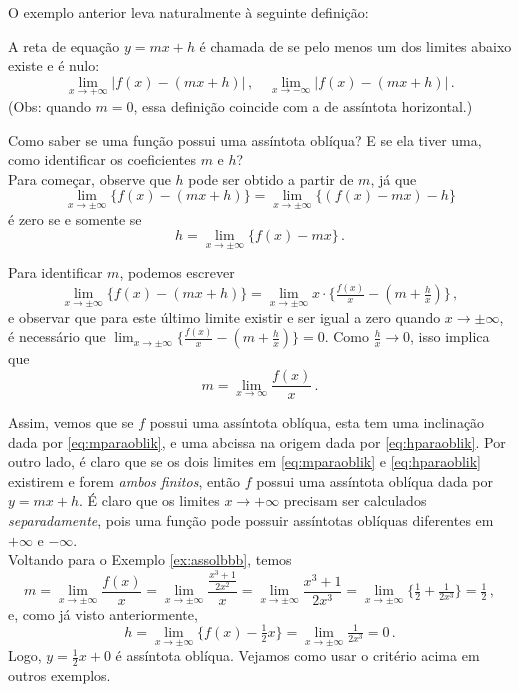 O exemplo anterior leva naturalmente à seguinte definição:

\begin{defin}
A reta de equação $y=mx+h$ é chamada de  
se pelo menos um
dos limites abaixo existe e é nulo:
$$\lim_{x\to +\infty}\bigl|f(x)-(mx+h)\bigr|\,,\quad\lim_{x\to
-\infty}\bigl|f(x)-(mx+h)\bigr|\,.$$
(Obs: quando $m=0$, essa definição coincide com a de assíntota
horizontal.)
\end{defin}

Como saber se uma função possui uma assíntota oblíqua? E se ela tiver uma, como
identificar os coeficientes $m$ e $h$?\\

Para começar, observe que $h$ pode ser obtido a partir de $m$, já que 
$$
\lim_{x\to \pm\infty}\bigl \{f(x)-(mx+h)\bigr\}=
\lim_{x\to \pm\infty}\bigl \{(f(x)-mx)-h\bigr\}
$$
é zero se e somente se 
\begin{equation}\label{eq:hparaoblik}
h=\lim_{x\to \pm\infty}\{f(x)-mx\}\,.
\end{equation}

Para identificar $m$, podemos escrever
$$\lim_{x\to \pm\infty}\bigl \{f(x)-(mx+h)\bigr\}
=\lim_{x\to \pm\infty}x\cdot \bigl\{\tfrac{f(x)}{x}-(m+\tfrac{h}{x})\bigr\}\,,
$$
e observar que para este último limite 
existir e ser igual a zero quando $x\to \pm \infty$, é necessário 
que 
$\lim_{x\to \pm \infty} \bigl\{\tfrac{f(x)}{x}-(m+\tfrac{h}{x})\bigr\}=0$. 
Como $\frac{h}{x}\to 0$, isso implica que
\begin{equation}\label{eq:mparaoblik}
m=\lim_{x\to \infty}\frac{f(x)}{x}\,.
\end{equation}

Assim, vemos que se $f$ possui uma 
assíntota oblíqua, esta tem uma inclinação
dada por \eqref{eq:mparaoblik}, e uma abcissa na origem dada por
\eqref{eq:hparaoblik}.
Por outro lado, é claro que se os dois limites em
\eqref{eq:mparaoblik} e 
\eqref{eq:hparaoblik} existirem e forem \emph{ambos finitos}, então $f$
possui uma assíntota oblíqua dada por $y=mx+h$. 
É claro que os limites $x\to +\infty$ precisam ser calculados
\emph{separadamente}, pois uma função pode possuir assíntotas
oblíquas diferentes em $+\infty$ e $-\infty$.\\

Voltando para o Exemplo \ref{ex:assolbbb}, temos
$$
m=\lim_{x\to \pm \infty} \frac{f(x)}{x}=\lim_{x\to\pm\infty}
\frac{\frac{x^3+1}{2x^2}}{x}=
\lim_{x\to\pm\infty}\frac{x^3+1}{2x^3}
=\lim_{x\to\pm\infty}\bigl\{
\tfrac12+\tfrac{1}{2x^3}
\bigr\}=\tfrac12\,,
$$
e, como já visto anteriormente,
$$h=\lim_{x\to\pm \infty}
\{f(x)-\tfrac{1}{2}x\}=\lim_{x\to\pm \infty}
\tfrac{1}{2x^3}=0\,.
$$
Logo, $y=\tfrac12 x+0$ é assíntota oblíqua.
Vejamos como usar   o critério acima em outros exemplos.


